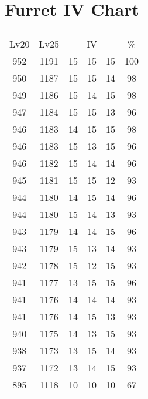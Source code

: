 \documentclass{article}%
\begin{document}
%
\normalsize%
\section{Furret IV Chart}%
\label{sec:Furret IV Chart}%
\renewcommand{\arraystretch}{1.5}%
\begin{tabular}{|c|c|c|c|c|c|}%
\hline%
\multicolumn{6}{|c|}{\textcolor{white}{ 
\linebreak{Furret}
}%
\cellcolor{black}}\\%
\multicolumn{1}{|c}{Lv20}&\multicolumn{1}{c|}{Lv25}&\multicolumn{3}{c|}{IV}&\multicolumn{1}{|c|}{\%}\\%
\hline%
\rowcolor{color100}%
952&1191&15&15&15&100\\%
\hline%
\rowcolor{color98}%
950&1187&15&15&14&98\\%
\hline%
\rowcolor{color98}%
949&1186&15&14&15&98\\%
\hline%
\rowcolor{color96}%
947&1184&15&15&13&96\\%
\hline%
\rowcolor{color98}%
946&1183&14&15&15&98\\%
\hline%
\rowcolor{color96}%
946&1183&15&13&15&96\\%
\hline%
\rowcolor{color96}%
946&1182&15&14&14&96\\%
\hline%
\rowcolor{color93}%
945&1181&15&15&12&93\\%
\hline%
\rowcolor{color96}%
944&1180&14&15&14&96\\%
\hline%
\rowcolor{color93}%
944&1180&15&14&13&93\\%
\hline%
\rowcolor{color96}%
943&1179&14&14&15&96\\%
\hline%
\rowcolor{color93}%
943&1179&15&13&14&93\\%
\hline%
\rowcolor{color93}%
942&1178&15&12&15&93\\%
\hline%
\rowcolor{color96}%
941&1177&13&15&15&96\\%
\hline%
\rowcolor{color93}%
941&1176&14&14&14&93\\%
\hline%
\rowcolor{color93}%
941&1176&14&15&13&93\\%
\hline%
\rowcolor{color93}%
940&1175&14&13&15&93\\%
\hline%
\rowcolor{color93}%
938&1173&13&15&14&93\\%
\hline%
\rowcolor{color93}%
937&1172&13&14&15&93\\%
\hline%
\rowcolor{color91}%
895&1118&10&10&10&67\\%
\end{tabular}

%
\end{document}
